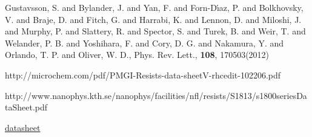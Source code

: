\begin{thebibliography}{99}
 {Gustavsson, S.   and Bylander, J.  and Yan,  F.  and Forn-D\'{\i}az,
    P.  and Bolkhovsky, V.  and Braje, D.  and  Fitch, G.  and Harrabi, K. and Lennon, D.  and
    Miloshi, J. and Murphy, P.  and Slattery, R.   and Spector, S. and Turek, B.  and Weir, T.
    and Welander,  P. B.  and Yoshihara,  F. and Cory, D.   G. and Nakamura, Y.   and Orlando,
    T. P.  and Oliver, W. D.}, {Phys. Rev. Lett.}, \textbf{108}, 170503(2012)



 http://microchem.com/pdf/PMGI-Resists-data-sheetV-rhcedit-102206.pdf
  
  http://www.nanophys.kth.se/nanophys/facilities/nfl/resists/S1813/s1800seriesDataSheet.pdf

  \href{http://microchem.com/products/images/uploads/MF_319_Data_Sheet.pdf}{datasheet}
\end{thebibliography}
